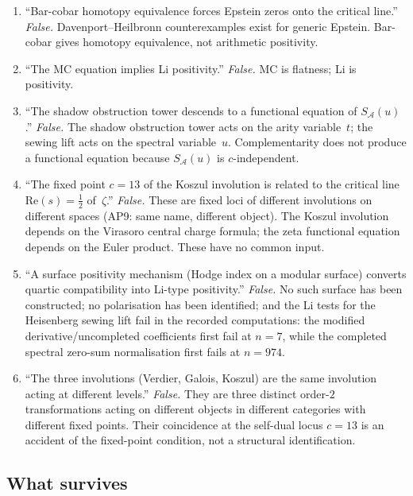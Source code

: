 \documentclass[11pt]{article}
\newcommand{\cA}{\mathcal{A}}
\begin{document}
\begin{enumerate}
\item ``Bar-cobar homotopy equivalence forces Epstein zeros
onto the critical line.'' \emph{False.}
Davenport--Heilbronn counterexamples exist for generic Epstein.
Bar-cobar gives homotopy equivalence, not arithmetic positivity.

\item ``The MC equation implies Li positivity.'' \emph{False.}
MC is flatness; Li is positivity.

\item ``The shadow obstruction tower descends to a functional equation
of $S_\cA(u)$.'' \emph{False.}  The shadow obstruction tower acts on the
arity variable~$t$; the sewing lift acts on the spectral
variable~$u$.  Complementarity does not produce a functional
equation because $S_\cA(u)$ is $c$-independent.

\item ``The fixed point $c = 13$ of the Koszul involution is
related to the critical line $\mathrm{Re}(s) = \tfrac{1}{2}$
of~$\zeta$.'' \emph{False.}  These are fixed loci of different
involutions on different spaces (AP9: same name, different
object).  The Koszul involution depends on the Virasoro central
charge formula; the zeta functional equation depends on the
Euler product.  These have no common input.

\item ``A surface positivity mechanism (Hodge index on a modular
surface) converts quartic compatibility into Li-type
positivity.'' \emph{False.}  No such surface has been
constructed; no polarisation has been identified; and the Li
tests for the Heisenberg sewing lift fail in the recorded
computations: the modified derivative/uncompleted coefficients
first fail at $n=7$, while the completed spectral zero-sum
normalisation first fails at $n=974$.

\item ``The three involutions (Verdier, Galois, Koszul) are the
same involution acting at different levels.'' \emph{False.}
They are three distinct order-$2$ transformations acting on
different objects in different categories with different fixed
points.  Their coincidence at the self-dual locus $c = 13$ is
an accident of the fixed-point condition, not a structural
identification.
\end{enumerate}

\subsection{What survives}
\end{document}
